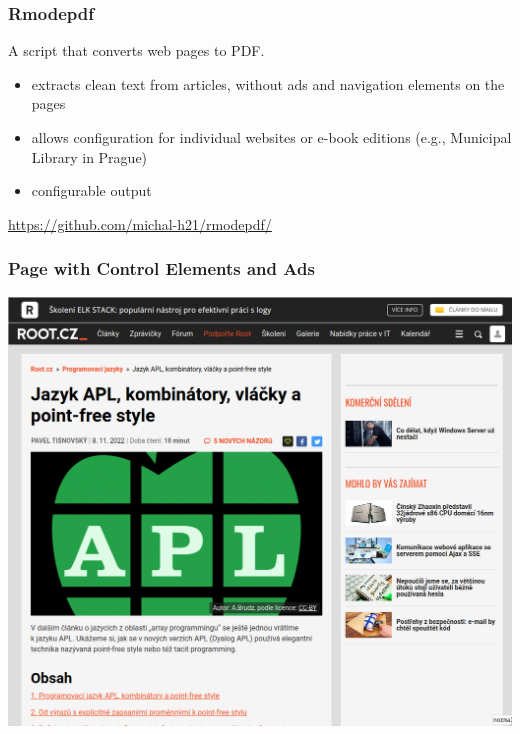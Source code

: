 \begin{frame}
  \frametitle{Rmodepdf}

  A script that converts  web pages to PDF.

  \begin{itemize}
    \item extracts clean text from articles, without ads and navigation elements on the pages
    \item allows configuration for individual websites or e-book editions (e.g., Municipal Library in Prague)
    \item configurable output 
  \end{itemize}

  \bigskip

  \url{https://github.com/michal-h21/rmodepdf/}
\end{frame}

\begin{frame}
  \frametitle{Page with Control Elements and Ads}
  \begin{center}
    \includegraphics[height=.7\textheight]{img/root-balast.png}
  \end{center}
\end{frame}

